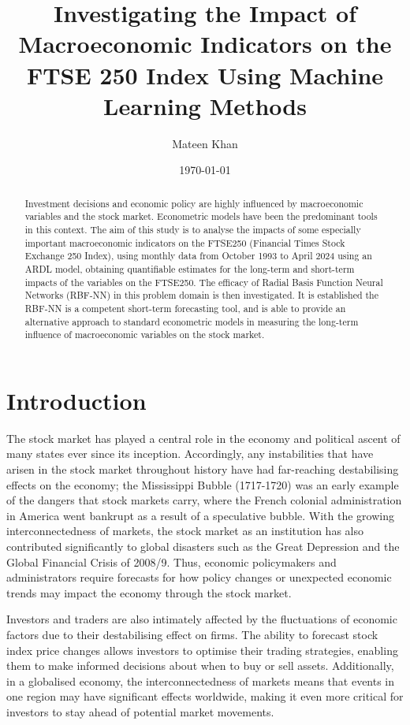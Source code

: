 \documentclass[11pt,a4paper]{article}
\title{Investigating the Impact of Macroeconomic Indicators 
on the FTSE 250 Index Using Machine Learning Methods}
\author{Mateen Khan}
\date{\today}
\begin{document}
\maketitle

\begin{abstract}
    Investment decisions and economic policy are highly influenced by 
    macroeconomic variables and the stock market. Econometric models
    have been the predominant tools in this context. The aim of this study is to analyse the impacts of some especially important macroeconomic
    indicators on the FTSE250 
    (Financial Times Stock Exchange 250 Index), using monthly data 
    from  October 1993 to April 2024 using an ARDL model, obtaining 
    quantifiable estimates for the long-term and short-term impacts of the variables
    on the FTSE250. The efficacy of Radial Basis Function 
    Neural Networks (RBF-NN) in this problem domain is then investigated. It is established 
    the RBF-NN is a competent short-term forecasting tool, and is able to 
    provide an alternative approach to standard econometric models in measuring the long-term influence of
    macroeconomic variables on the stock market.
\end{abstract}

\section{Introduction}

The stock market has played a central role in the economy and 
political ascent of many states ever since its inception. 
Accordingly, any instabilities that have arisen in the stock market 
throughout history have had far-reaching destabilising effects on the 
economy; the Mississippi Bubble (1717-1720) was an early example of the 
dangers that stock markets carry, where the French colonial administration 
in America went bankrupt as a result of a speculative bubble. With the
growing interconnectedness of markets, the stock market as an institution 
has also contributed significantly to global disasters such as the Great 
Depression and the Global Financial Crisis of 2008/9. Thus, economic 
policymakers and administrators require forecasts for how policy changes or 
unexpected economic trends may impact the economy through the stock market. 

Investors and traders are also intimately affected by the 
fluctuations of economic factors due to their destabilising effect on firms.
The ability to forecast stock index price changes allows 
investors to optimise their trading strategies, enabling them to make
informed decisions about when to buy or sell assets. 
Additionally, in a globalised economy, the interconnectedness of 
markets means that events in one region may have significant effects worldwide, 
making it even more critical for investors to stay ahead of potential market movements.
\end{document}
